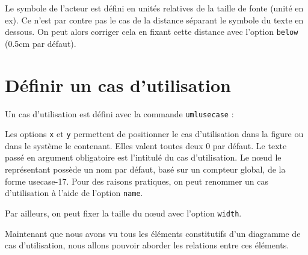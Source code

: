 \documentclass[a4paper,11pt]{report}
\newcommand{\inputTikZ}[1]{%
  }%
\newcommand{\inputTikZ}[1]{%
    \texttt{[image: fig/\#1.pdf]}%
  }%
\begin{document}
\medskip

Le symbole de l'acteur est défini en unités relatives de la taille de fonte (unité en ex). Ce n'est par contre pas le cas de la distance séparant le symbole du texte en dessous. On peut alors corriger cela en fixant cette distance avec l'option {\tt below} (0.5cm par défaut).

\medskip
 
\begin{minipage}{0.5\textwidth}

\end{minipage}
\begin{minipage}{0.5\textwidth}
\begin{center}
\inputTikZ{actorfont}
\end{center}
\end{minipage}

\section{Définir un cas d'utilisation}\label{s.usecase}

Un cas d'utilisation est défini avec la commande {\tt umlusecase} :

\medskip

\begin{minipage}{0.5\textwidth}

\end{minipage}
\begin{minipage}{0.5\textwidth}
\begin{center}
\inputTikZ{usecase}
\end{center}
\end{minipage}

\medskip

Les options {\tt x} et {\tt y} permettent de positionner le cas d'utilisation dans la figure ou dans le système le contenant. Elles valent toutes deux 0 par défaut. Le texte passé en argument obligatoire est l'intitulé du cas d'utilisation. Le n\oe{}ud le représentant possède un nom par défaut, basé sur un compteur global, de la forme usecase-17. Pour des raisons pratiques, on peut renommer un cas d'utilisation à l'aide de l'option {\tt name}.

Par ailleurs, on peut fixer la taille du n\oe{}ud avec l'option {\tt width}.

\medskip

Maintenant que nous avons vu tous les éléments constitutifs d'un diagramme de cas d'utilisation, nous allons pouvoir aborder les relations entre ces éléments.
\end{document}
